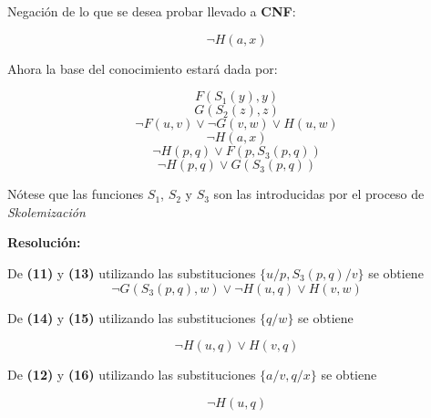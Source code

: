 \documentclass[12pt]{article} %
\begin{document}
\par Negación de lo que se desea probar llevado a \textbf{CNF}:

\begin{equation}
\neg H(a,x)
\end{equation}

\par Ahora la base del conocimiento estará dada por:


\begin{equation}
F(S_1(y), y)
\end{equation}
\begin{equation}
G(S_2(z),z)
\end{equation}
\begin{equation}
\neg F(u,v) \vee \neg G(v,w) \vee H(u,w)
\end{equation}
\begin{equation}
\neg H(a,x)
\end{equation}
\begin{equation}
\neg H(p,q) \vee F(p, S_3(p,q))
\end{equation}
\begin{equation}
\neg H(p,q) \vee G(S_3(p,q))
\end{equation}

\par Nótese que las funciones $S_1$, $S_2$ y $S_3$ son las introducidas por el proceso de \textit{Skolemización} \\
\par \textbf{Resolución:}\\

\par De \textbf{(11)} y \textbf{(13)} utilizando las substituciones $\{u/p, S_3(p,q)/v\}$ se obtiene
\begin{equation}
\neg G(S_3(p,q), w) \vee \neg H(u,q) \vee H(v,w)
\end{equation}

\par De \textbf{(14)} y \textbf{(15)} utilizando las substituciones $\{q/w\}$ se obtiene

\begin{equation}
\neg H(u,q) \vee H(v,q)
\end{equation}

\par De \textbf{(12)} y \textbf{(16)} utilizando las substituciones $\{a/v, q/x\}$ se obtiene

\begin{equation}
\neg H(u,q)
\end{equation}
\end{document}
